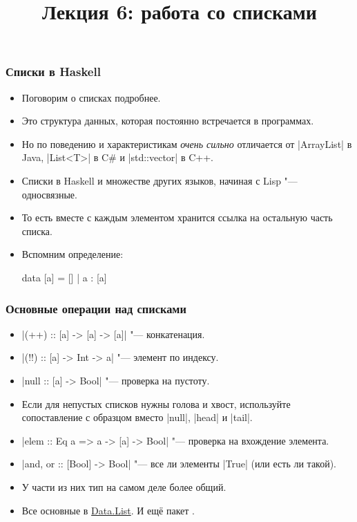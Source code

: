 \documentclass[11pt]{beamer}
\title{Лекция 6: работа со списками}
\begin{document}
\begin{frame}[plain]
  \maketitle
\end{frame}

\begin{frame}[fragile]
  \frametitle{Списки в Haskell}
  \begin{itemize}
    \item Поговорим о списках подробнее.
    \item Это структура данных, которая постоянно встречается в программах.
    \item Но по поведению и характеристикам \emph{очень сильно} отличается от \haskinline|ArrayList| в Java, \haskinline|List<T>| в C\# и \haskinline|std::vector| в C++.
          \pause
    \item Списки в Haskell и множестве других языков, начиная с Lisp "--- односвязные.
          \pause
    \item То есть вместе с каждым элементом хранится ссылка на остальную часть списка.
    \item Вспомним определение:
          \begin{haskell}
            data [a] = [] | a : [a]
          \end{haskell}
  \end{itemize}
\end{frame}

\begin{frame}[fragile]
  \frametitle{Основные операции над списками}
  \begin{itemize}
    \item \haskinline|(++) :: [a] -> [a] -> [a]| \pause"--- конкатенация.
    \item \haskinline[escapeinside=``]|(!!) :: [a] -> Int -> a| \pause"--- элемент по индексу.
    \item \haskinline|null :: [a] -> Bool| \pause"--- проверка на пустоту.
    \item Если для непустых списков нужны голова и хвост, используйте сопоставление с образцом вместо \haskinline|null|, \haskinline|head| и \haskinline|tail|.
    \item \haskinline|elem :: Eq a => a -> [a] -> Bool| \pause"--- проверка на вхождение элемента.
    \item \haskinline|and, or :: [Bool] -> Bool| \pause"--- все ли элементы \haskinline|True| (или есть ли такой).
          \pause
    \item У части из них тип на самом деле более общий.
          \pause
    \item Все основные в \href{https://hackage.haskell.org/package/base/docs/Data-List.html}{Data.List}. И ещё пакет .
  \end{itemize}
\end{frame}
\end{document}
